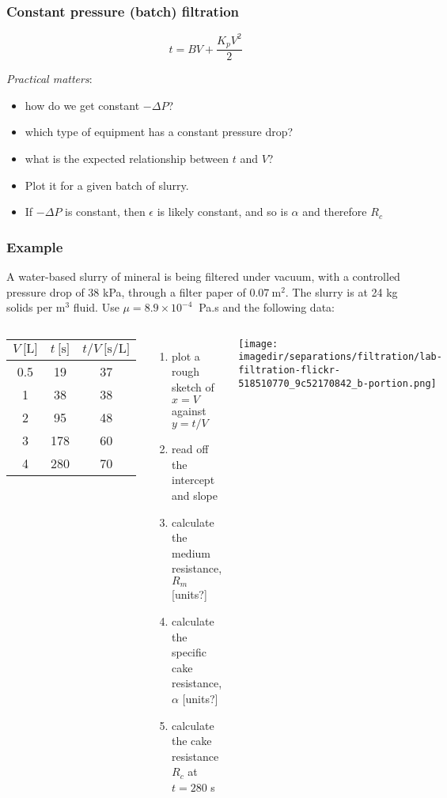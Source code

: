 \begin{frame}\frametitle{Constant pressure (batch) filtration}
	\[ t = BV +  \dfrac{K_pV^2}{2} \]
	\vspace{12pt}

	\emph{Practical matters}:
	\begin{itemize}
		\item	how do we get constant $-\Delta P$?
		\item	which type of equipment has a constant pressure drop?
		\item	what is the expected relationship between $t$ and $V$?
		\item	Plot it for a given batch of slurry.
		\item	If $-\Delta P$ is constant, then $\epsilon$ is likely constant, and so is $\alpha$ and therefore $R_c$
	\end{itemize}
\end{frame}

\begin{frame}\frametitle{Example}
	A water-based slurry of mineral is being filtered under vacuum, with a controlled pressure drop of 38 kPa, through a filter paper of $0.07~\text{m}^2$. The slurry is at 24 kg solids per $\text{m}^3$ fluid. Use $\mu = 8.9 \times 10^{-4}~$ Pa.s and the following data:

	\begin{columns}[t]
			\vspace{-12pt}
			\begin{center}
				\begin{tabular}{c|c||c}
					$V~\text{[L]}$		&	$t~\text{[s]}$  & $t/V~\text{[s/L]}$\\ \hline
					0.5				 	& 	19 & 37\\
					1					& 	38 & 38\\
					2					& 	95 & 48\\
					3					& 	178 & 60\\
					4					&	280 & 70\\ \hline
				\end{tabular}
			\end{center}
			\begin{enumerate}
				\item	plot a rough sketch of $x=V$ against $y=t/V$
				\item	read off the intercept and slope
				\item	calculate the medium resistance, $R_m$ [units?]
				\item	calculate the specific cake resistance, $\alpha$ [units?]
				\item	calculate the cake resistance $R_c$ at $t=280$ s
			\end{enumerate}
			\begin{center}
				\texttt{[image: \\imagedir/separations/filtration/lab-filtration-flickr-518510770\_9c52170842\_b-portion.png]}
			\end{center}
	\end{columns}
\end{frame}

